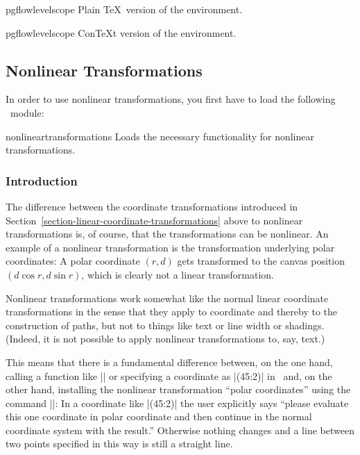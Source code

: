 \begin{plainenvironment}{{pgflowlevelscope}}
  Plain \TeX\ version of the environment.
\end{plainenvironment}

\begin{contextenvironment}{{pgflowlevelscope}}
  Con\TeX t version of the environment.
\end{contextenvironment}


\subsection{Nonlinear Transformations}
\label{section-nonlinear-transformations}
In order to use nonlinear transformations, you first have to load the
following \pgfname\ module:

\begin{pgfmodule}{nonlineartransformations}
  Loads the necessary functionality for nonlinear transformations.
\end{pgfmodule}


\subsubsection{Introduction}

The difference between the coordinate transformations introduced in
Section~\ref{section-linear-coordinate-transformations} above to
nonlinear transformations is, of course, that the transformations can
be nonlinear. An example of a nonlinear transformation is the
transformation underlying polar coordinates: A polar coordinate
$(r,d)$ gets transformed to the canvas position $(d\cos r,d\sin r)$,
which is clearly not a linear transformation.

Nonlinear transformations work somewhat like the normal linear
coordinate transformations in the sense that they apply to coordinate
and thereby to the construction of paths, but not to things like text
or line width or shadings. (Indeed, it is not possible to apply
nonlinear transformations to, say, text.)

This means that there is a fundamental
difference between, on the one hand, calling a function like
|\pgfpointpolar| or specifying a coordinate as |(45:2)| in \tikzname\
and, on the other hand, installing the nonlinear transformation
``polar coordinates'' using the command |\pgftransformnonlinear|: In a
coordinate like |(45:2)| the user explicitly says ``please evaluate
this one  coordinate in polar coordinate and then continue in the
normal coordinate system with the result.'' Otherwise nothing changes
and a line between two points specified in this way is still a
straight line.

